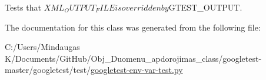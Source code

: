 \begin{DoxyVerb}Tests that $XML_OUTPUT_FILE is overridden by $GTEST_OUTPUT.\end{DoxyVerb}
 

The documentation for this class was generated from the following file\+:\begin{DoxyCompactItemize}
\item 
C\+:/\+Users/\+Mindaugas K/\+Documents/\+Git\+Hub/\+Obj\+\_\+\+Duomenu\+\_\+apdorojimas\+\_\+class/googletest-\/master/googletest/test/\mbox{\hyperlink{googletest-master_2googletest_2test_2googletest-env-var-test_8py}{googletest-\/env-\/var-\/test.\+py}}\end{DoxyCompactItemize}
